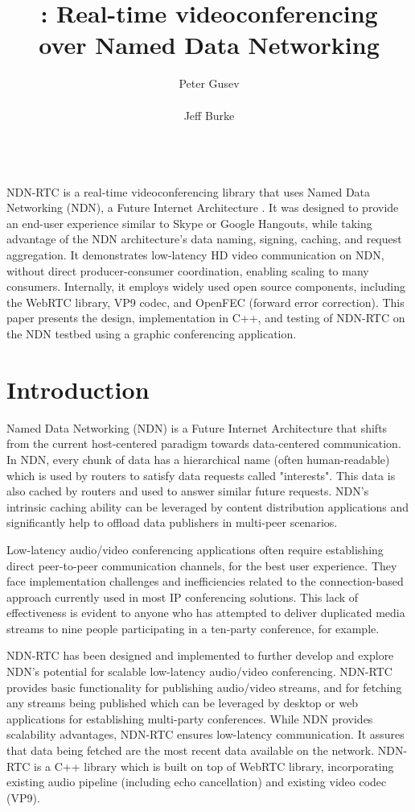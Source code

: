 \documentclass{icn/sig-alternate-2012} %
\title{\ndnrtcName{}: Real-time videoconferencing\\ over Named Data Networking}
\author{
\alignauthor Peter Gusev\\
       \affaddr{UCLA REMAP}\\
       \email{peter@remap.ucla.edu}
\alignauthor Jeff Burke\\
       \affaddr{UCLA REMAP}\\
       \email{jburke@remap.ucla.edu}
}
\newcommand{\ndnrtcName}{NDN-RTC} %
\begin{document}
\maketitle

\abstract
\ndnrtcName{} is a real-time videoconferencing library that uses Named Data Networking (NDN), a Future Internet Architecture . It was designed to provide an end-user experience similar to Skype or Google Hangouts, while taking advantage of the NDN architecture's data naming, signing, caching, and request aggregation. It demonstrates low-latency HD video communication on NDN, without direct producer-consumer coordination, enabling scaling to many consumers. Internally, it employs widely used open source components, including the WebRTC library, VP9 codec, and OpenFEC (forward error correction). This paper presents the design, implementation in C++, and testing of \ndnrtcName{} on the NDN testbed using a graphic conferencing application.

\section{Introduction}
Named Data Networking (NDN) is a Future Internet Architecture that shifts from the current host-centered paradigm towards data-centered communication.~\cite{ndntechreport} In NDN, every chunk of data has a hierarchical name (often human-readable) which is used by routers to satisfy data requests called "interests". This data is also cached by routers and used to answer similar future requests. NDN's intrinsic caching ability can be leveraged by content distribution applications and significantly help to offload data publishers in multi-peer scenarios.

Low-latency audio/video conferencing applications often require establishing direct peer-to-peer communication channels, for the best user experience. They face implementation challenges and inefficiencies related to the connection-based approach currently used in most IP conferencing solutions. This lack of effectiveness is evident to anyone who has attempted to deliver duplicated media streams to nine people participating in a ten-party conference, for example.

\ndnrtcName{} has been designed and implemented to further develop and explore NDN's potential for scalable low-latency audio/video conferencing. \ndnrtcName{} provides basic functionality for publishing audio/video streams, and for fetching any streams being published which can be leveraged by desktop or web applications for establishing multi-party conferences. While NDN provides scalability advantages, \ndnrtcName{} ensures low-latency communication. It assures that data being fetched are the most recent data available on the network. \ndnrtcName{} is a C++ library which is built on top of WebRTC library, incorporating existing audio pipeline (including echo cancellation) and existing video codec (VP9).
\end{document}
